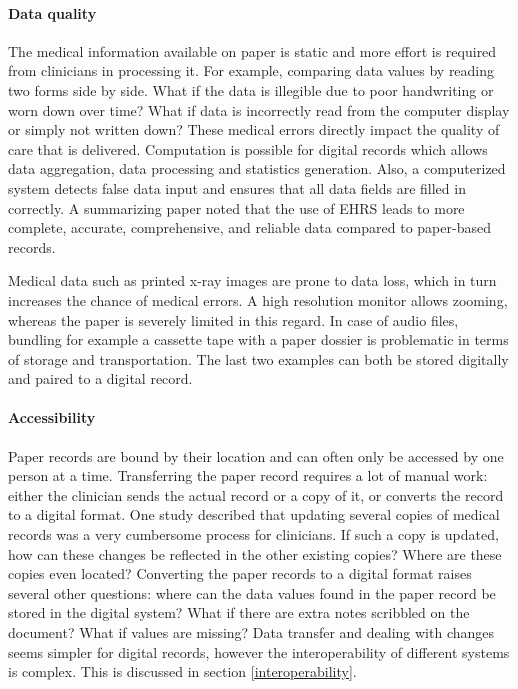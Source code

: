     \paragraph{Data quality} The medical information available on paper is static and more effort is required from clinicians in processing it. For example, comparing data values by reading two forms side by side. What if the data is illegible due to poor handwriting or worn down over time? What if data is incorrectly read from the computer display or simply not written down? These medical errors directly impact the quality of care that is delivered\cite{Elnahal2011}\cite{Hillestad2005}. Computation is possible for digital records which allows data aggregation, data processing and statistics generation. Also, a computerized system detects false data input and ensures that all data fields are filled in correctly. A summarizing paper noted that the use of EHRS leads to more complete, accurate, comprehensive, and reliable data compared to paper-based records\cite{Hayrinen2008}.

    Medical data such as printed x-ray images are prone to data loss, which in turn increases the chance of medical errors. A high resolution monitor allows zooming, whereas the paper is severely limited in this regard. In case of audio files, bundling for example a cassette tape with a paper dossier is problematic in terms of storage and transportation. The last two examples can both be stored digitally and paired to a digital record.

    \paragraph{Accessibility} Paper records are bound by their location and can often only be accessed by one person at a time. Transferring the paper record requires a lot of manual work: either the clinician sends the actual record or a copy of it, or converts the record to a digital format. One study described that updating several copies of medical records was a very cumbersome process for clinicians\cite{Tange1999}. If such a copy is updated, how can these changes be reflected in the other existing copies? Where are these copies even located? Converting the paper records to a digital format raises several other questions: where can the data values found in the paper record be stored in the digital system? What if there are extra notes scribbled on the document? What if values are missing? Data transfer and dealing with changes seems simpler for digital records, however the interoperability of different systems is complex. This is discussed in section \ref{interoperability}. %

